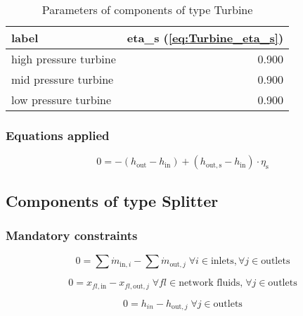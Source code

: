 \begin{table}[H]\begin{center}
\begin{tabular}{lr}
\toprule
                 label &  eta\_s (\ref{eq:Turbine_eta_s}) \\
\midrule
 high pressure turbine &                            0.900 \\
  mid pressure turbine &                            0.900 \\
  low pressure turbine &                            0.900 \\
\bottomrule
\end{tabular}
\caption{Parameters of components of type Turbine}
\end{center}\end{table}

\subsubsection{Equations applied}

\begin{equation}
\label{eq:Turbine_eta_s}
0=-\left(h_\mathrm{out}-h_\mathrm{in}\right)+\left(h_\mathrm{out,s}-h_\mathrm{in}\right)\cdot\eta_\mathrm{s}
\end{equation}


\subsection{Components of type Splitter}

\subsubsection{Mandatory constraints}

\begin{equation}
\label{eq:Splitter_mass_flow_constraints}
0 =\sum\dot{m}_{\mathrm{in},i}-\sum\dot{m}_{\mathrm{out},j}\;\forall i \in \text{inlets}, \forall j \in \text{outlets}
\end{equation}

\begin{equation}
\label{eq:Splitter_fluid_constraints}
0 = x_{fl\mathrm{,in}} - x_{fl\mathrm{,out,}j}\; \forall fl \in \text{network fluids,} \; \forall j \in\text{outlets}
\end{equation}

\begin{equation}
\label{eq:Splitter_energy_balance_constraints}
0=h_{in}-h_{\mathrm{out,}j}\;\forall j \in\text{outlets}
\end{equation}

